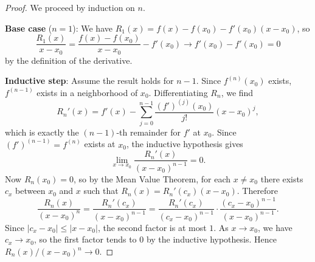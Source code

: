 \documentclass[../master/master.tex]{subfiles}
\begin{document}
\begin{proof}
We proceed by induction on $n$.

\textbf{Base case} ($n = 1$): We have $R_1(x) = f(x) - f(x_0) - f'(x_0)(x - x_0)$, so
\[
\frac{R_1(x)}{x - x_0} = \frac{f(x) - f(x_0)}{x - x_0} - f'(x_0) \to f'(x_0) - f'(x_0) = 0
\]
by the definition of the derivative.

\textbf{Inductive step}: Assume the result holds for $n - 1$. Since $f^{(n)}(x_0)$ exists, $f^{(n-1)}$ exists in a neighborhood of $x_0$. Differentiating $R_n$, we find
\[
R_n'(x) = f'(x) - \sum_{j=0}^{n-1} \frac{(f')^{(j)}(x_0)}{j!}(x - x_0)^j,
\]
which is exactly the $(n-1)$-th remainder for $f'$ at $x_0$. Since $(f')^{(n-1)} = f^{(n)}$ exists at $x_0$, the inductive hypothesis gives
\[
\lim_{x \to x_0} \frac{R_n'(x)}{(x - x_0)^{n-1}} = 0.
\]
Now $R_n(x_0) = 0$, so by the Mean Value Theorem, for each $x \neq x_0$ there exists $c_x$ between $x_0$ and $x$ such that $R_n(x) = R_n'(c_x)(x - x_0)$. Therefore
\[
\frac{R_n(x)}{(x - x_0)^n} = \frac{R_n'(c_x)}{(x - x_0)^{n-1}} = \frac{R_n'(c_x)}{(c_x - x_0)^{n-1}} \cdot \frac{(c_x - x_0)^{n-1}}{(x - x_0)^{n-1}}.
\]
Since $|c_x - x_0| \leq |x - x_0|$, the second factor is at most $1$. As $x \to x_0$, we have $c_x \to x_0$, so the first factor tends to $0$ by the inductive hypothesis. Hence $R_n(x)/(x - x_0)^n \to 0$.
\end{proof}
\end{document}
